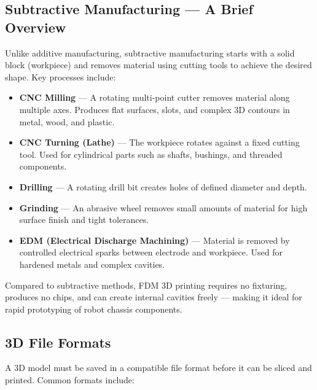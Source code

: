 \documentclass[12pt, a4paper]{article}
\begin{document}
\subsection{Subtractive Manufacturing --- A Brief Overview}

Unlike additive manufacturing, subtractive manufacturing starts with a solid
block (workpiece) and removes material using cutting tools to achieve the
desired shape. Key processes include:

\begin{itemize}[itemsep=3pt]
  \item \textbf{CNC Milling} --- A rotating multi-point cutter removes material
  along multiple axes. Produces flat surfaces, slots, and complex 3D contours
  in metal, wood, and plastic.
  \item \textbf{CNC Turning (Lathe)} --- The workpiece rotates against a fixed
  cutting tool. Used for cylindrical parts such as shafts, bushings, and
  threaded components.
  \item \textbf{Drilling} --- A rotating drill bit creates holes of defined
  diameter and depth.
  \item \textbf{Grinding} --- An abrasive wheel removes small amounts of
  material for high surface finish and tight tolerances.
  \item \textbf{EDM (Electrical Discharge Machining)} --- Material is removed
  by controlled electrical sparks between electrode and workpiece. Used for
  hardened metals and complex cavities.
\end{itemize}

Compared to subtractive methods, FDM 3D printing requires no fixturing, produces
no chips, and can create internal cavities freely --- making it ideal for rapid
prototyping of robot chassis components.

\subsection{3D File Formats}

A 3D model must be saved in a compatible file format before it can be sliced and
printed. Common formats include:
\end{document}
